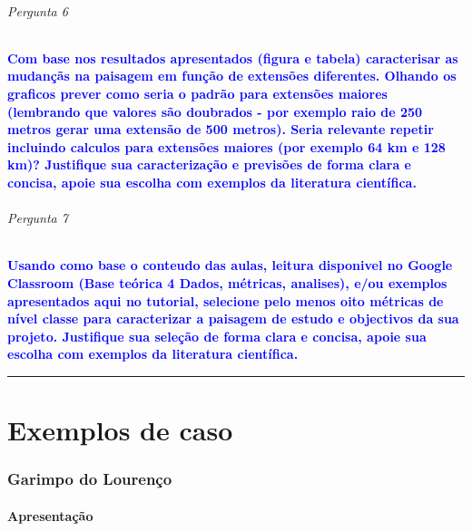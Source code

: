 \documentclass[
]{article}
\begin{document}
\hypertarget{pergunta-6-1}{%
\paragraph{Pergunta 6}\label{pergunta-6-1}}

\textcolor{blue}{\textbf{Com base nos resultados apresentados (figura e tabela) caracterisar as mudançãs na paisagem em função de extensões diferentes. Olhando os graficos prever como seria o padrão para extensões maiores (lembrando que valores são doubrados - por exemplo raio de 250 metros gerar uma extensão de 500 metros). Seria relevante repetir incluindo calculos para extensões maiores (por exemplo 64 km e 128 km)? Justifique sua caracterização e previsões de forma clara e concisa, apoie sua escolha com exemplos da literatura científica.}}

\hypertarget{pergunta-7}{%
\paragraph{Pergunta 7}\label{pergunta-7}}

\textcolor{blue}{\textbf{Usando como base o conteudo das aulas, leitura disponivel no Google Classroom (Base teórica 4 Dados, métricas, analises), e/ou exemplos apresentados aqui no tutorial, selecione pelo menos oito métricas de nível classe para caracterizar a paisagem de estudo e objectivos da sua projeto. Justifique sua seleção de forma clara e concisa, apoie sua escolha com exemplos da literatura científica.}}

\begin{center}\rule{0.5\linewidth}{0.5pt}\end{center}

\newpage{}

\hypertarget{part-exemplos-de-caso}{%
\part{Exemplos de caso}\label{part-exemplos-de-caso}}

\newpage{}

\hypertarget{garimpo-do-lourenuxe7o}{%
\section{Garimpo do Lourenço}\label{garimpo-do-lourenuxe7o}}

\hypertarget{apresentauxe7uxe3o-2}{%
\subsection{Apresentação}\label{apresentauxe7uxe3o-2}}
\end{document}
